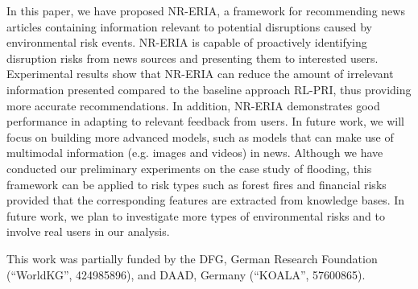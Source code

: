 \documentclass[
]{ceurart}
\begin{document}
In this paper, we have proposed NR-ERIA, a framework for recommending news articles containing information relevant to potential disruptions caused by environmental risk events. NR-ERIA is capable of proactively identifying disruption risks from news sources and presenting them to interested users. Experimental results show that NR-ERIA can reduce the amount of irrelevant information presented compared to the baseline approach RL-PRI, thus providing more accurate recommendations. In addition, NR-ERIA demonstrates good performance in adapting to relevant feedback from users. In future work, we will focus on building more advanced models, such as models that can make use of multimodal information (e.g. images and videos) in news. Although we have conducted our preliminary experiments on the case study of flooding, this framework can be applied to risk types such as forest fires and financial risks provided that the corresponding features are extracted from knowledge bases. In future work, we plan to investigate more types of environmental risks and to involve real users in our analysis.


\begin{acknowledgments}

This work was partially funded by the DFG, German Research Foundation (``WorldKG'', 424985896), and DAAD, Germany (``KOALA'', 57600865).

\end{acknowledgments}

 
\end{document}
